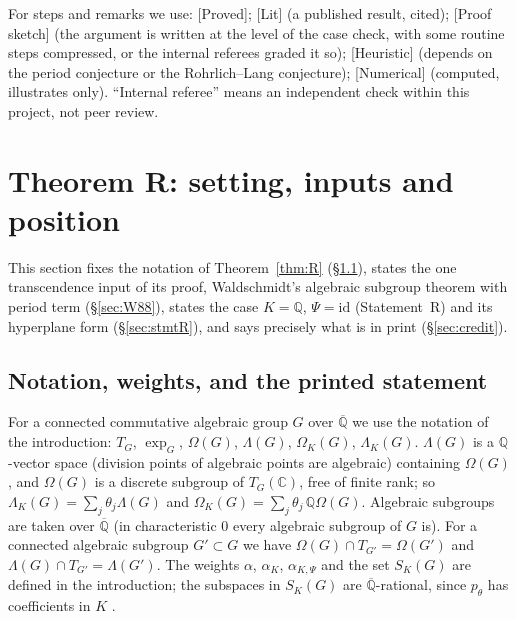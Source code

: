 \documentclass[11pt]{amsart}
\theoremstyle{definition}
\newcommand{\Qb}{\overline{\mathbb{Q}}}
\newcommand{\C}{\mathbb{C}}
\newcommand{\Q}{\mathbb{Q}}
\newcommand{\lab}[1]{\textup{[#1]}}
\begin{document}
For steps and remarks we use: \lab{Proved}; \lab{Lit} (a published result, cited); \lab{Proof sketch} (the argument is
written at the level of the case check, with some routine steps compressed, or the internal referees graded it so);
\lab{Heuristic} (depends on the period conjecture or the Rohrlich--Lang conjecture); \lab{Numerical} (computed,
illustrates only). ``Internal referee'' means an independent check within this project, not peer review.

\section{Theorem R: setting, inputs and position}\label{sec:method}
This section fixes the notation of Theorem~\ref{thm:R} (\S\ref{sec:RW}), states the one transcendence input of its proof,
Waldschmidt's algebraic subgroup theorem with period term (\S\ref{sec:W88}), states the case $K=\Q$, $\Psi=\mathrm{id}$
(Statement~R) and its hyperplane form (\S\ref{sec:stmtR}), and says precisely what is in print (\S\ref{sec:credit}).

\subsection{Notation, weights, and the printed statement}\label{sec:RW}
For a connected commutative algebraic group $G$ over $\Qb$ we use the notation of the introduction: $T_G$, $\exp_G$,
$\Omega(G)$, $\Lambda(G)$, $\Omega_K(G)$, $\Lambda_K(G)$. $\Lambda(G)$ is a $\Q$-vector space (division points of algebraic
points are algebraic) containing $\Omega(G)$, and $\Omega(G)$ is a discrete subgroup of $T_G(\C)$, free of finite rank; so
$\Lambda_K(G)=\sum_j\theta_j\Lambda(G)$ and $\Omega_K(G)=\sum_j\theta_j\,\Q\Omega(G)$. Algebraic subgroups are taken over $\Qb$
(in characteristic $0$ every algebraic subgroup of $G$ is). For a connected algebraic subgroup $G'\subset G$ we have
$\Omega(G)\cap T_{G'}=\Omega(G')$ and $\Lambda(G)\cap T_{G'}=\Lambda(G')$. The weights $\alpha$, $\alpha_K$, $\alpha_{K,\Psi}$
and the set $S_K(G)$ are defined in the introduction; the subspaces in $S_K(G)$ are $\Qb$-rational, since $p_\theta$ has
coefficients in $K$ \cite[p.~360]{RW93}.
\end{document}
